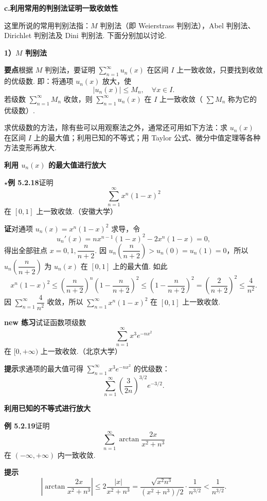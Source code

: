 \documentclass[UTF8,12pt,a4paper,fontset=fandol]{ctexart}
\begin{document}
\noindent\textbf{c.\quad 利用常用的判别法证明一致收敛性}

这里所说的常用判别法指：$M$ 判别法（即 Weierstrass 判别法），Abel 判别法、Dirichlet 判别法及 Dini 判别法. 下面分别加以讨论.

\noindent\textbf{1）$M$ 判别法}

\noindent\textbf{要点}\quad 根据 $M$ 判别法，要证明
$\displaystyle\sum_{n=1}^{\infty}u_n(x)$ 在区间 $I$ 上一致收敛，只要找到收敛的优级数. 即：将通项
$u_n(x)$ 放大，使
\[
  |u_n(x)|\le M_n,\quad \forall x\in I.
\]
若级数 $\displaystyle\sum_{n=1}^{\infty}M_n$ 收敛，则
$\displaystyle\sum_{n=1}^{\infty}u_n(x)$ 在 $I$ 上一致收敛（
$\displaystyle\sum M_n$ 称为它的优级数）.

求优级数的方法，除有些可以用观察法之外，通常还可用如下方法：求 $u_n(x)$ 在区间
$I$ 上的最大值；利用已知的不等式；用 Taylor 公式、微分中值定理等各种方法变形再放大.

\noindent\textbf{利用 $u_n(x)$ 的最大值进行放大}

\noindent\textbf{$\star$例 5.2.18}\quad 证明
\[
  \sum_{n=1}^{\infty}x^n(1-x)^2
\]
在 $[0,1]$ 上一致收敛.（安徽大学）

\noindent\textbf{证}\quad 对通项 $u_n(x)=x^n(1-x)^2$ 求导，令
\[
  u_n'(x)=nx^{n-1}(1-x)^2-2x^n(1-x)=0,
\]
得出全部驻点 $x=0,1,\dfrac{n}{n+2}$. 因
$u_n\left(\dfrac{n}{n+2}\right)>u_n(0)=u_n(1)=0$，所以
$u_n\left(\dfrac{n}{n+2}\right)$ 为 $u_n(x)$ 在 $[0,1]$ 上的最大值. 如此
\[
  x^n(1-x)^2
  \le\left(\frac{n}{n+2}\right)^n\left(1-\frac{n}{n+2}\right)^2
  \le\left(1-\frac{n}{n+2}\right)^2
  =\left(\frac2{n+2}\right)^2\le\frac4{n^2}.
\]
因 $\displaystyle\sum_{n=1}^{\infty}\dfrac4{n^2}$ 收敛，所以
$\displaystyle\sum_{n=1}^{\infty}x^n(1-x)^2$ 在 $[0,1]$ 上一致收敛.

\noindent\textbf{new 练习}\quad 试证函数项级数
\[
  \sum_{n=1}^{\infty}x^3e^{-nx^2}
\]
在 $[0,+\infty)$ 上一致收敛.（北京大学）

\noindent\textbf{提示}\quad 求通项的最大值可得
$\displaystyle\sum_{n=1}^{\infty}x^3e^{-nx^2}$ 的优级数：
\[
  \sum_{n=1}^{\infty}\left(\frac3{2n}\right)^{3/2}e^{-3/2}.
\]

\noindent\textbf{利用已知的不等式进行放大}

\noindent\textbf{例 5.2.19}\quad 证明
\[
  \sum_{n=1}^{\infty}\arctan\frac{2x}{x^2+n^3}
\]
在 $(-\infty,+\infty)$ 内一致收敛.

\noindent\textbf{提示}\quad
\[
  \left|\arctan\frac{2x}{x^2+n^3}\right|
  \le2\frac{|x|}{x^2+n^3}
  =\frac{\sqrt{x^2n^3}}{(x^2+n^3)/2}\cdot\frac1{n^{3/2}}<\frac1{n^{3/2}}.
\]
\end{document}
